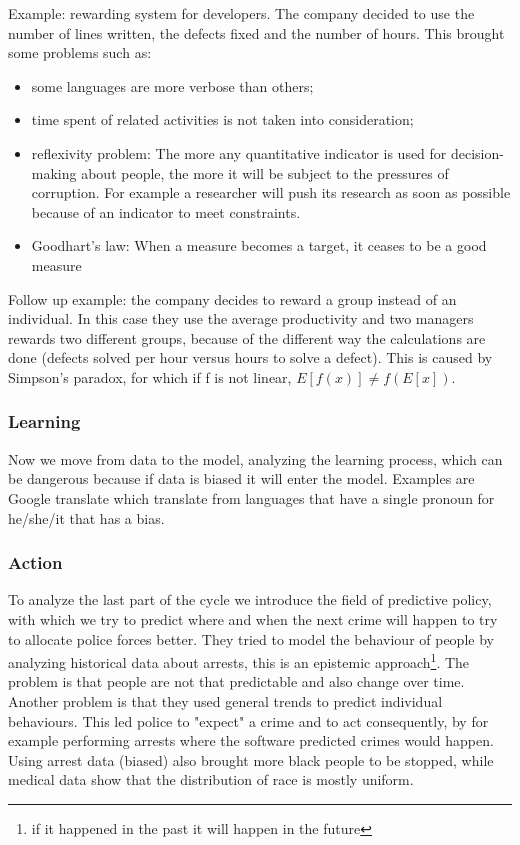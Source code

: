 Example: rewarding system for developers. The company decided to use the number of lines written,  the defects fixed and the number of hours. This brought some problems such as:
\begin{itemize}
    \item some languages are more verbose than others;
    \item time spent of related activities is not taken into consideration;
    \item reflexivity problem: The more any quantitative indicator is used for decision-making about people, the more it will be subject to the pressures of corruption. For example a researcher will push its research as soon as possible because of an indicator to meet constraints.
    \item Goodhart's law: When a measure becomes a target, it ceases to be a good measure
\end{itemize}

Follow up example: the company decides to reward a group instead of an individual. In this case they use the average productivity and two managers rewards two different groups, because of the different way the calculations are done (defects solved per hour versus hours to solve a defect). This is caused by Simpson's paradox, for which if f is not linear, $E[f(x)] \neq f(E[x])$.

\subsubsection{Learning}
Now we move from data to the model, analyzing the learning process, which can be dangerous because if data is biased it will enter the model. Examples are Google translate which translate from languages that have a single pronoun for he/she/it that has a bias.

\subsubsection{Action}
To analyze the last part of the cycle we introduce the field of predictive policy, with which we try to predict where and when the next crime will happen to try to allocate police forces better. They tried to model the behaviour of people by analyzing historical data about arrests, this is an epistemic approach\footnote{if it happened in the past it will happen in the future}. The problem is that people are not that predictable and also change over time. Another problem is that they used general trends to predict individual behaviours. This led police to "expect" a crime and to act consequently, by for example performing arrests where the software predicted crimes would happen. Using arrest data (biased) also brought more black people to be stopped, while medical data show that the distribution of race is mostly uniform. 

